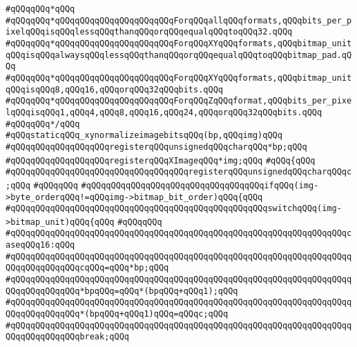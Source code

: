 \verb|#qQQqqQQq*qQQq|\newline
\verb|#qQQqqQQq*qQQqqQQqqQQqqQQqqQQqqQQqForqQQqallqQQqformats,qQQqbits_per_pixelqQQqisqQQqlessqQQqthanqQQqorqQQqequalqQQqtoqQQq32.qQQq|\newline
\verb|#qQQqqQQq*qQQqqQQqqQQqqQQqqQQqqQQqForqQQqXYqQQqformats,qQQqbitmap_unitqQQqisqQQqalwaysqQQqlessqQQqthanqQQqorqQQqequalqQQqtoqQQqbitmap_pad.qQQq|\newline
\verb|#qQQqqQQq*qQQqqQQqqQQqqQQqqQQqqQQqForqQQqXYqQQqformats,qQQqbitmap_unitqQQqisqQQq8,qQQq16,qQQqorqQQq32qQQqbits.qQQq|\newline
\verb|#qQQqqQQq*qQQqqQQqqQQqqQQqqQQqqQQqForqQQqZqQQqformat,qQQqbits_per_pixelqQQqisqQQq1,qQQq4,qQQq8,qQQq16,qQQq24,qQQqorqQQq32qQQqbits.qQQq|\newline
\verb|#qQQqqQQq*/qQQq|\newline
\verb|#qQQqstaticqQQq_xynormalizeimagebitsqQQq(bp,qQQqimg)qQQq|\newline
\verb|#qQQqqQQqqQQqqQQqqQQqregisterqQQqunsignedqQQqcharqQQq*bp;qQQq|\newline
\verb|#qQQqqQQqqQQqqQQqqQQqregisterqQQqXImageqQQq*img;qQQq|\newline
\verb|#qQQq{qQQq|\newline
\verb|#qQQqqQQqqQQqqQQqqQQqqQQqqQQqqQQqqQQqregisterqQQqunsignedqQQqcharqQQqc;qQQq|\newline
\verb|#qQQqqQQq|\newline
\verb|#qQQqqQQqqQQqqQQqqQQqqQQqqQQqqQQqqQQqifqQQq(img->byte_orderqQQq!=qQQqimg->bitmap_bit_order)qQQq{qQQq|\newline
\verb|#qQQqqQQqqQQqqQQqqQQqqQQqqQQqqQQqqQQqqQQqqQQqqQQqqQQqswitchqQQq(img->bitmap_unit)qQQq{qQQq|\newline
\verb|#qQQqqQQq|\newline
\verb|#qQQqqQQqqQQqqQQqqQQqqQQqqQQqqQQqqQQqqQQqqQQqqQQqqQQqqQQqqQQqqQQqqQQqcaseqQQq16:qQQq|\newline
\verb|#qQQqqQQqqQQqqQQqqQQqqQQqqQQqqQQqqQQqqQQqqQQqqQQqqQQqqQQqqQQqqQQqqQQqqQQqqQQqqQQqqQQqcqQQq=qQQq*bp;qQQq|\newline
\verb|#qQQqqQQqqQQqqQQqqQQqqQQqqQQqqQQqqQQqqQQqqQQqqQQqqQQqqQQqqQQqqQQqqQQqqQQqqQQqqQQqqQQq*bpqQQq=qQQq*(bpqQQq+qQQq1);qQQq|\newline
\verb|#qQQqqQQqqQQqqQQqqQQqqQQqqQQqqQQqqQQqqQQqqQQqqQQqqQQqqQQqqQQqqQQqqQQqqQQqqQQqqQQqqQQq*(bpqQQq+qQQq1)qQQq=qQQqc;qQQq|\newline
\verb|#qQQqqQQqqQQqqQQqqQQqqQQqqQQqqQQqqQQqqQQqqQQqqQQqqQQqqQQqqQQqqQQqqQQqqQQqqQQqqQQqqQQqbreak;qQQq|\newline

